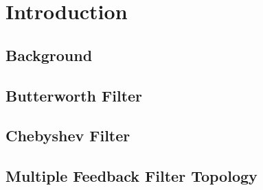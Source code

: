 \documentclass[12pt]{article}
\begin{document}


\pagebreak




\tableofcontents
\pagebreak

\section{Introduction}
\subsection{Background}


\subsection{Butterworth Filter}


\subsection{Chebyshev Filter}


\subsection{Multiple Feedback Filter Topology}


\end{document}
